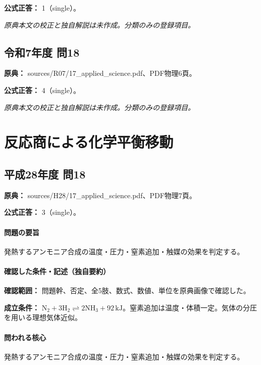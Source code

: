 \textbf{公式正答：} 1（single）。

\par\textit{原典本文の校正と独自解説は未作成。分類のみの登録項目。}

\subsection{令和7年度 問18}
\label{q:r07-reg-applied-18}

\noindent\textbf{原典：} sources/R07/17\_applied\_science.pdf、PDF物理6頁。

\textbf{公式正答：} 4（single）。

\par\textit{原典本文の校正と独自解説は未作成。分類のみの登録項目。}

\section{反応商による化学平衡移動}

\subsection{平成28年度 問18}
\label{q:h28-reg-applied-18}

\noindent\textbf{原典：} sources/H28/17\_applied\_science.pdf、PDF物理7頁。

\textbf{公式正答：} 3（single）。

\paragraph{問題の要旨} 発熱するアンモニア合成の温度・圧力・窒素追加・触媒の効果を判定する。

\paragraph{確認した条件・記述（独自要約）}\mbox{}\par

\noindent\textbf{確認範囲：} 問題幹、否定、全5肢、数式、数値、単位を原典画像で確認した。\par

\noindent\textbf{成立条件：} \(\mathrm{N_2+3H_2\rightleftharpoons2NH_3}+92\,\mathrm{kJ}\)。窒素追加は温度・体積一定。気体の分圧を用いる理想気体近似。\par

\paragraph{問われる核心} 発熱するアンモニア合成の温度・圧力・窒素追加・触媒の効果を判定する。

